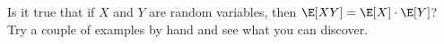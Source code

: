   Is it true that if $X$ and $Y$ are random variables, then
  $\E[XY] = \E[X] \cdot \E[Y]$?
  Try a couple of examples by hand and see what you can discover.
